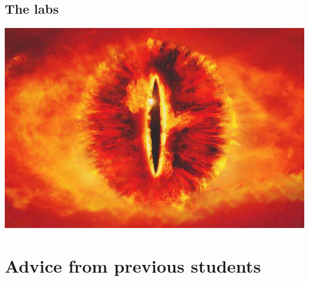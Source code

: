 \subsection{The labs}

\begin{frame}
  \includegraphics[width=\columnwidth]{figs/sauron.jpg}
\end{frame}


\section{Advice from previous students}

\begin{frame}
  
\end{frame}


\begin{frame}[allowframebreaks]
  \printbibliography{}
\end{frame}
